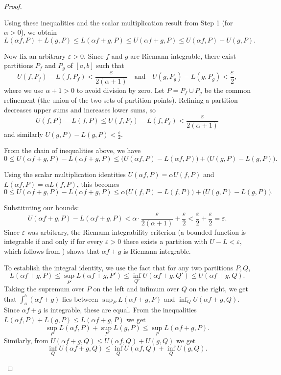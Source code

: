 \begin{proof}
\begin{enumerate}
    Using these inequalities and the scalar multiplication result from Step 1 (for $\alpha > 0$), we obtain
    $$L(\alpha f,P) + L(g,P) \leq L(\alpha f + g,P) \leq U(\alpha f + g,P) \leq U(\alpha f,P) + U(g,P).$$

    Now fix an arbitrary $\varepsilon > 0$. Since $f$ and $g$ are Riemann integrable, there exist partitions $P_f$ and $P_g$ of $[a,b]$ such that
    $$U(f,P_f) - L(f,P_f) < \frac{\varepsilon}{2(\alpha + 1)} \quad\text{and}\quad U(g,P_g) - L(g,P_g) < \frac{\varepsilon}{2},$$
    where we use $\alpha+1 > 0$ to avoid division by zero. Let $P = P_f \cup P_g$ be the common refinement (the union of the two sets of partition points). Refining a partition decreases upper sums and increases lower sums, so
    $$U(f,P) - L(f,P) \leq U(f,P_f) - L(f,P_f) < \frac{\varepsilon}{2(\alpha + 1)}$$ and similarly $U(g,P) - L(g,P) < \frac{\varepsilon}{2}$.

    From the chain of inequalities above, we have
    $$0 \leq U(\alpha f + g,P) - L(\alpha f + g,P) \leq \bigl(U(\alpha f,P) - L(\alpha f,P)\bigr) + \bigl(U(g,P) - L(g,P)\bigr).$$

    Using the scalar multiplication identities $U(\alpha f,P) = \alpha U(f,P)$ and $L(\alpha f,P) = \alpha L(f,P)$, this becomes
    $$0 \leq U(\alpha f + g,P) - L(\alpha f + g,P) \leq \alpha\bigl(U(f,P) - L(f,P)\bigr) + \bigl(U(g,P) - L(g,P)\bigr).$$

    Substituting our bounds:
    $$U(\alpha f + g,P) - L(\alpha f + g,P) < \alpha \cdot \frac{\varepsilon}{2(\alpha+1)} + \frac{\varepsilon}{2} < \frac{\varepsilon}{2} + \frac{\varepsilon}{2} = \varepsilon.$$
    Since $\varepsilon$ was arbitrary, the Riemann integrability criterion (a bounded function is integrable if and only if for every $\varepsilon > 0$ there exists a partition with $U - L < \varepsilon$, which follows from ) shows that $\alpha f + g$ is Riemann integrable.

    To establish the integral identity, we use the fact that for any two partitions $P,Q$,
    $$L(\alpha f + g,P) \leq \sup_{P'} L(\alpha f + g,P') \leq \inf_{Q'} U(\alpha f + g,Q') \leq U(\alpha f + g,Q).$$
    Taking the supremum over $P$ on the left and infimum over $Q$ on the right, we get that $\int_a^b (\alpha f + g)$ lies between $\sup_P L(\alpha f + g,P)$ and $\inf_Q U(\alpha f + g,Q)$. Since $\alpha f + g$ is integrable, these are equal. From the inequalities $L(\alpha f,P) + L(g,P) \leq L(\alpha f+g,P)$ we get
    $$\sup_P L(\alpha f,P) + \sup_P L(g,P) \leq \sup_P L(\alpha f + g,P).$$
    Similarly, from $U(\alpha f + g,Q) \leq U(\alpha f,Q) + U(g,Q)$ we get
    $$\inf_Q U(\alpha f + g,Q) \leq \inf_Q U(\alpha f,Q) + \inf_Q U(g,Q).$$


\end{enumerate}
\end{proof}
